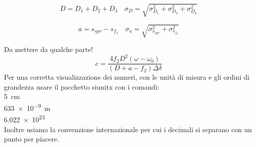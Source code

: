 \documentclass[a4paper,11pt]{article}
\begin{document}
	
	\begin{equation}\label{eqn:D}
	D = D_1 + D_2 + D_3 \quad \sigma_D = \sqrt{\sigma_{D_1}^2 + \sigma_{D_2}^2 + \sigma_{D_3}^2}
	\end{equation}
	
	\begin{equation}\label{eqn:a}
	a = s_{spr} - s_{f_2} \quad \sigma_a = \sqrt{ \sigma_{s_{spr}}^2+\sigma_{s_{f_2}}^2}
	\end{equation}
	
	Da mettere da qualche parte!
	\begin{equation}\label{eqn:c}
	c = \dfrac{4 f_2 D^2 \left(\omega - \omega_0 \right)}{\left(D + a - f_2\right)\Delta\delta}
	\end{equation}
	Per una corretta visualizzazione dei numeri, con le unità di misura e gli ordini di grandezza usare il pacchetto siunitx con i comandi:\\
	
		\SI{5}{\centi\meter}
	\\
		\SI{633e-9}{\meter}
	\\
		\num{6.022e23}
	\\
	Inoltre usiamo la convenzione internazionale per cui i decimali si separano con un punto per piacere.
	

	
\end{document}
